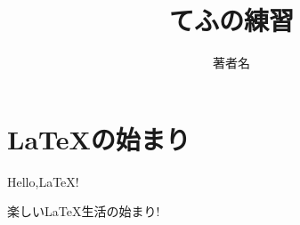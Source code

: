 \documentclass[a4paper]{jsarticle}
\title{てふの練習}
\author{著者名}
\begin{document}
\maketitle
\section{\LaTeX の始まり}
Hello,\LaTeX !

楽しい\LaTeX 生活の始まり!
\end{document}
